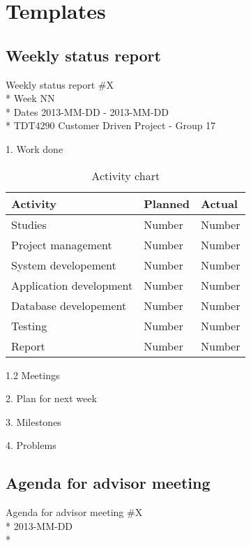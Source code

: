 \chapter{Templates}
\label{AppendixC} 

\section{Weekly status report}

\begin{center}
Weekly status report \#X\\*
Week NN \\*
Dates 2013-MM-DD - 2013-MM-DD \\*
TDT4290 Customer Driven Project - Group 17
\end{center}

1. Work done

\begin{table}
\begin{center}
\begin{tabular}{ l | l | l }
  \hline
  Activity & Planned & Actual \\
  \hline\noalign{\smallskip}\noalign{\smallskip}\hline
  Studies & Number & Number \\
  Project management & Number & Number \\
  System developement & Number & Number \\
  Application development & Number & Number \\
  Database developement & Number & Number \\
  Testing & Number & Number \\
  Report & Number & Number \\
  \hline
\end{tabular}
\end{center}
\caption{Activity chart}
\label{table:activityChartStatusReport}
\end{table}

1.2 Meetings

2. Plan for next week

3. Milestones

4. Problems


\section{Agenda for advisor meeting}

\begin{center}
Agenda for advisor meeting \#X\\*
2013-MM-DD\\*
\end{center}

